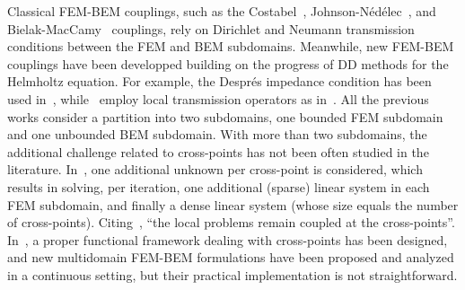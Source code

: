 \documentclass[a4paper,11pt]{article}
\begin{document}
Classical FEM-BEM couplings, such as the Costabel~\cite{Costabel1987SMC},
Johnson-Nédélec~\cite{JohnsonNedelec1980CBI}, and
Bielak-MacCamy~\cite{MR700668} couplings, rely on Dirichlet and Neumann
transmission conditions between the FEM and BEM subdomains. Meanwhile, new
FEM-BEM couplings have been developped building on the progress of DD
methods for the Helmholtz equation. For example, the Després impedance
condition has been used in~\cite{BendaliBoubendirEtAl2007FDD},
while~\cite{Caudron2018CFB,CaudronAntoineEtAl2020OWC} employ local
transmission operators as in~\cite{BoubendirAntoineEtAl2012QON}. All the
previous works consider a partition into two subdomains, one bounded FEM
subdomain and one unbounded BEM subdomain. With more than two subdomains,
the additional challenge related to cross-points has not been often studied
in the literature. In~\cite{BoubendirBendaliEtAl2008CNO}, one additional
unknown per cross-point is considered, which results in solving, per
iteration, one additional (sparse) linear system in each FEM subdomain, and
finally a dense linear system (whose size equals the number of
cross-points). Citing~\cite{BoubendirBendaliEtAl2008CNO}, ``the local
problems remain coupled at the cross-points''. In~\cite{MR4779883}, a
proper functional framework dealing with cross-points has been designed,
and new multidomain FEM-BEM formulations have been proposed and analyzed in
a continuous setting, but their practical implementation is not
straightforward.
\end{document}
